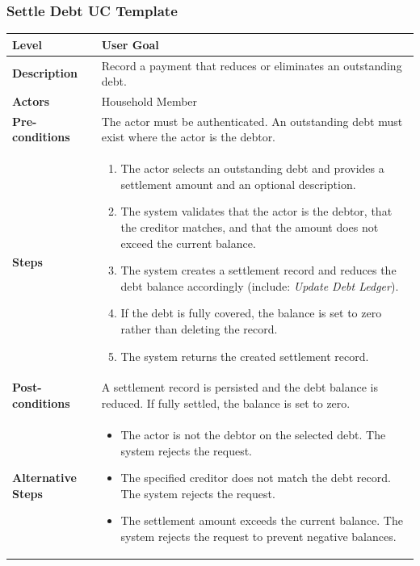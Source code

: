 \subsubsection{Settle Debt UC Template}
\begin{longtable}{|p{3.5cm}|p{10.3cm}|}
\hline
\rowcolor{UCRow} \textbf{Level} & User Goal \\ \hline
\textbf{Description} & Record a payment that reduces or eliminates an outstanding debt. \\ \hline
\rowcolor{UCRow} \textbf{Actors} & Household Member \\ \hline
\textbf{Pre-conditions} & The actor must be authenticated. An outstanding debt must exist where the actor is the debtor. \\ \hline
\rowcolor{UCRow} \textbf{Steps} &
\begin{enumerate}[nosep, leftmargin=*]
    \item The actor selects an outstanding debt and provides a settlement amount and an optional description.
    \item The system validates that the actor is the debtor, that the creditor matches, and that the amount does not exceed the current balance.
    \item The system creates a settlement record and reduces the debt balance accordingly (include: \textit{Update Debt Ledger}).
    \item If the debt is fully covered, the balance is set to zero rather than deleting the record.
    \item The system returns the created settlement record.
\end{enumerate} \\ \hline
\textbf{Post-conditions} & A settlement record is persisted and the debt balance is reduced. If fully settled, the balance is set to zero. \\ \hline
\rowcolor{UCRow} \textbf{Alternative Steps} &
\begin{itemize}[nosep, leftmargin=2.5em]
    \item[\textbf{A1.}] The actor is not the debtor on the selected debt. The system rejects the request.
    \item[\textbf{A2.}] The specified creditor does not match the debt record. The system rejects the request.
    \item[\textbf{A3.}] The settlement amount exceeds the current balance. The system rejects the request to prevent negative balances.
\end{itemize} \\ \hline
\end{longtable}

